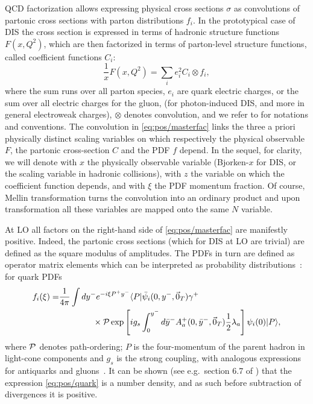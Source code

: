 
QCD factorization allows expressing physical cross sections $\sigma$  as
convolutions of partonic cross sections with parton distributions $f_i$. 
In the prototypical case of DIS the cross section is expressed in terms of
hadronic structure functions $F(x,Q^2)$, which are then factorized in terms of
parton-level structure functions, called coefficient functions $C_i$:
\begin{equation}
  \label{eq:pos/masterfac}
 \frac{1}{x} F(x,Q^2)=\sum_{i} e^2_i C_i \otimes f_i ,
\end{equation}
where the sum runs over all parton species, $e_i$ are quark electric charges,
or the sum over all electric charges for the gluon, (for photon-induced DIS,
and more in general electroweak charges), $\otimes$ denotes convolution, and we
refer to \cite{Ellis:1991qj} for notations and conventions. 
The convolution in \cref{eq:pos/masterfac} links the three a priori physically
distinct scaling variables on which respectively the physical observable $F$,
the partonic cross-section $C$ and the PDF $f$ depend.
In the sequel, for
clarity, we will denote with $x$ the physically observable variable
(Bjorken-$x$ for DIS, or the scaling variable in hadronic collisions), with $z$
the variable on which the coefficient function depends, and with $\xi$ the PDF
momentum fraction.
Of course, Mellin transformation turns the convolution into an ordinary product
and upon transformation all these variables are mapped onto the same $N$
variable. 
 
At LO all factors on the right-hand side of \cref{eq:pos/masterfac} are
manifestly positive.
Indeed, the partonic cross sections (which for DIS at LO are trivial) are
defined as the square modulus of amplitudes. 
The PDFs in turn are defined as operator matrix elements which can be
interpreted as probability distributions~\cite{Collins:1981uw,Curci:1980uw}:
for quark PDFs~\cite{Collins:1981uw}  
\begin{align}
    \label{eq:pos/quark}
    f_i(\xi)=
    &\frac{1}{4\pi}\int dy^- e^{-i \xi P^+ y^-}
    \langle P| \bar \psi_i(0,y^-,\vec 0_T)\gamma^+
    \nonumber\\ 
    &\qquad\qquad
    \times{\cal P} \exp\left[ i g_s \int_0^{y^-} d
    \bar y^- A_a^+(0,\bar y^-,\vec 0_T)\frac{1}{2} \lambda_a\right] \psi_i(0) |P\rangle ,
\end{align}
where ${\cal P}$ denotes path-ordering; $P$ is the four-momentum of
the parent hadron in light-cone components and $g_s$ is the strong
coupling, with analogous expressions for antiquarks and
gluons~\cite{Collins:1981uw}.
It can be shown (see e.g.\ section 6.7 of \cite{Collins:2011zzd}) that the
expression \cref{eq:pos/quark} is a number density, and as such before
subtraction of divergences it is positive.

